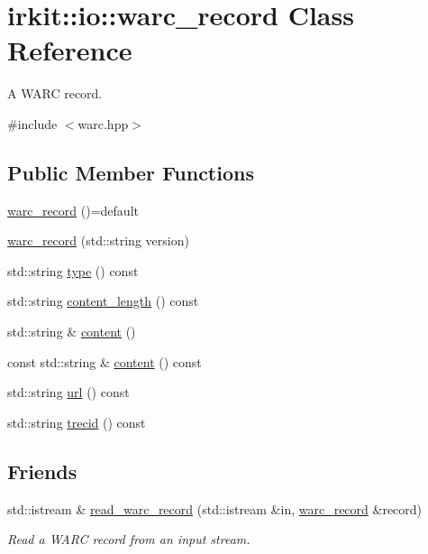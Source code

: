 \hypertarget{classirkit_1_1io_1_1warc__record}{}\section{irkit\+:\+:io\+:\+:warc\+\_\+record Class Reference}
\label{classirkit_1_1io_1_1warc__record}


A W\+A\+RC record.  




{\ttfamily \#include $<$warc.\+hpp$>$}

\subsection*{Public Member Functions}
\begin{DoxyCompactItemize}
\item 
\mbox{\hyperlink{classirkit_1_1io_1_1warc__record_adbf4f3980cefeb456de898d0415b4e36}{warc\+\_\+record}} ()=default
\item 
\mbox{\hyperlink{classirkit_1_1io_1_1warc__record_a88b5dab62123bbbef9cd5b58b74e76e7}{warc\+\_\+record}} (std\+::string version)
\item 
std\+::string \mbox{\hyperlink{classirkit_1_1io_1_1warc__record_a2d8b476a009344abc9f1d41f5c9e3de0}{type}} () const
\item 
std\+::string \mbox{\hyperlink{classirkit_1_1io_1_1warc__record_a46c46772b6e77545047ab9c8cbe5d281}{content\+\_\+length}} () const
\item 
std\+::string \& \mbox{\hyperlink{classirkit_1_1io_1_1warc__record_ab53f61c5eb11564671280cdd7666352b}{content}} ()
\item 
const std\+::string \& \mbox{\hyperlink{classirkit_1_1io_1_1warc__record_a3ac994f3690d28a5add45485a3b388ec}{content}} () const
\item 
std\+::string \mbox{\hyperlink{classirkit_1_1io_1_1warc__record_ae5bab7d203ec2705e3ae9c4d20b1286c}{url}} () const
\item 
std\+::string \mbox{\hyperlink{classirkit_1_1io_1_1warc__record_a5a0ce07bbe522fedf5a49d4cac2c1520}{trecid}} () const
\end{DoxyCompactItemize}
\subsection*{Friends}
\begin{DoxyCompactItemize}
\item 
std\+::istream \& \mbox{\hyperlink{classirkit_1_1io_1_1warc__record_a3ffe8b4b7fc8c809d6ce483d2272f7a3}{read\+\_\+warc\+\_\+record}} (std\+::istream \&in, \mbox{\hyperlink{classirkit_1_1io_1_1warc__record}{warc\+\_\+record}} \&record)
\begin{DoxyCompactList}\small\item\em Read a W\+A\+RC record from an input stream. \end{DoxyCompactList}\end{DoxyCompactItemize}


